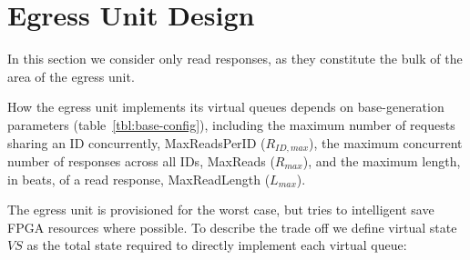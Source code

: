 \begin{table}
\begin{center}
\end{center}
\caption{Generator base configuration parameters.}
\label{tbl:base-config}
\end{table}%

\section{Egress Unit Design}\label{sec:egress}

In this section we consider only read responses, as they constitute the bulk of the area of the egress unit.

How the egress unit implements its virtual queues depends on base-generation
parameters (table~\ref{tbl:base-config}), including the maximum number of
requests sharing an ID concurrently,  MaxReadsPerID ($R_{ID,max}$), the maximum
concurrent number of responses across all IDs, MaxReads ($R_{max}$), and the
maximum length, in beats, of a read response, MaxReadLength ($L_{max}$).

The egress unit is provisioned for the worst case, but tries to intelligent
save FPGA resources where possible. To describe the trade off we define virtual
state $VS$ as the total state required to directly implement each virtual
queue:

